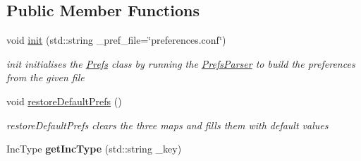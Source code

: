 \subsection*{Public Member Functions}
\begin{DoxyCompactItemize}
\item 
void \hyperlink{class_prefs_a6a519af5b4ddc87023111c80332a1895}{init} (std\+::string \+\_\+pref\+\_\+file=\char`\"{}preferences.\+conf\char`\"{})
\begin{DoxyCompactList}\small\item\em init initialises the \hyperlink{class_prefs}{Prefs} class by running the \hyperlink{class_prefs_parser}{Prefs\+Parser} to build the preferences from the given file \end{DoxyCompactList}\item 
\hypertarget{class_prefs_aa74c172ddda1876616263fc8cfc36050}{}void \hyperlink{class_prefs_aa74c172ddda1876616263fc8cfc36050}{restore\+Default\+Prefs} ()\label{class_prefs_aa74c172ddda1876616263fc8cfc36050}

\begin{DoxyCompactList}\small\item\em restore\+Default\+Prefs clears the three maps and fills them with default values \end{DoxyCompactList}\item 
\hypertarget{class_prefs_aeecc6a555bbb40a57a3e23d39f1e599c}{}Inc\+Type {\bfseries get\+Inc\+Type} (std\+::string \+\_\+key)\label{class_prefs_aeecc6a555bbb40a57a3e23d39f1e599c}


\end{DoxyCompactItemize}
